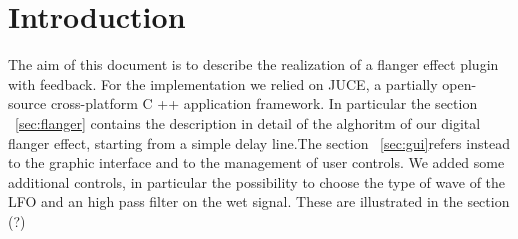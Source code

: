 \section{Introduction}

The aim of this document is to describe the realization of a flanger effect plugin with feedback. For the implementation we relied on JUCE, a partially open-source cross-platform C ++ application framework.
In particular the section ~\ref{sec:flanger} contains the description in detail of the alghoritm of our digital flanger effect, starting from a simple delay line.The section ~\ref{sec:gui}refers instead to the graphic interface and to the management of user controls. We added some additional controls, in particular the possibility to choose the type of wave of the LFO and an high pass filter on the wet signal. These are illustrated in the section (?)